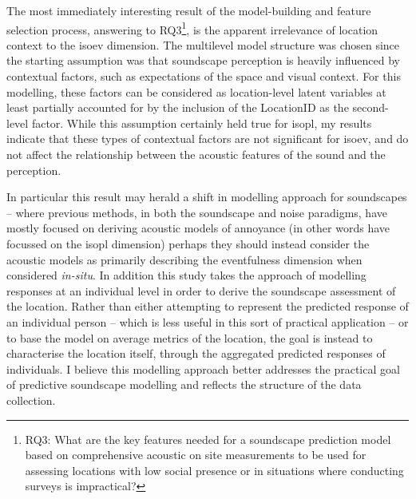    The most immediately interesting result of the model-building and feature selection process, answering to RQ3\footnote{RQ3: What are the key features needed for a soundscape prediction model based on comprehensive acoustic on site measurements to be used for assessing locations with low social presence or in situations where conducting surveys is impractical?}, is the apparent irrelevance of location context to the \gls{isoev} dimension. The multilevel model structure was chosen since the starting assumption was that soundscape perception is heavily influenced by contextual factors, such as expectations of the space and visual context. For this modelling, these factors can be considered as location-level latent variables at least partially accounted for by the inclusion of the LocationID as the second-level factor. While this assumption certainly held true for \gls{isopl}, my results indicate that these types of contextual factors are not significant for \gls{isoev}, and do not affect the relationship between the acoustic features of the sound and the perception. 

   In particular this result may herald a shift in modelling approach for soundscapes -- where previous methods, in both the soundscape and noise paradigms, have mostly focused on deriving acoustic models of annoyance (in other words have focussed on the \gls{isopl} dimension) perhaps they should instead consider the acoustic models as primarily describing the eventfulness dimension when considered \emph{in-situ}. In addition this study takes the approach of modelling responses at an individual level in order to derive the soundscape assessment of the location. Rather than either attempting to represent the predicted response of an individual person -- which is less useful in this sort of practical application -- or to base the model on average metrics of the location, the goal is instead to characterise the location itself, through the aggregated predicted responses of individuals. I believe this modelling approach better addresses the practical goal of predictive soundscape modelling and reflects the structure of the data collection.

